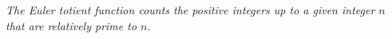 \begin{defn}
    \textit{The Euler totient function counts the positive integers up to a given integer \(n\) that are relatively prime to \(n\)}.
\end{defn}